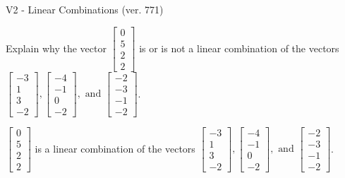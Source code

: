 \begin{exercise}
  \begin{exerciseTitle}V2 - Linear Combinations (ver. 771)\end{exerciseTitle}
  \begin{exerciseStatement}
    Explain why the vector \(\left[\begin{array}{c}
0 \\
5 \\
2 \\
2
\end{array}\right]\)  is or is not a linear 
	combination of the vectors \(\left[\begin{array}{c}
-3 \\
1 \\
3 \\
-2
\end{array}\right] , \left[\begin{array}{c}
-4 \\
-1 \\
0 \\
-2
\end{array}\right] , \text{ and } \left[\begin{array}{c}
-2 \\
-3 \\
-1 \\
-2
\end{array}\right]\).
	


  \end{exerciseStatement}
  \begin{exerciseAnswer}
   \(\left[\begin{array}{c}
0 \\
5 \\
2 \\
2
\end{array}\right]\) 
  	 is  
	a linear combination of the vectors \(\left[\begin{array}{c}
-3 \\
1 \\
3 \\
-2
\end{array}\right] , \left[\begin{array}{c}
-4 \\
-1 \\
0 \\
-2
\end{array}\right] , \text{ and } \left[\begin{array}{c}
-2 \\
-3 \\
-1 \\
-2
\end{array}\right]\).

	
  


  \end{exerciseAnswer}
\end{exercise}